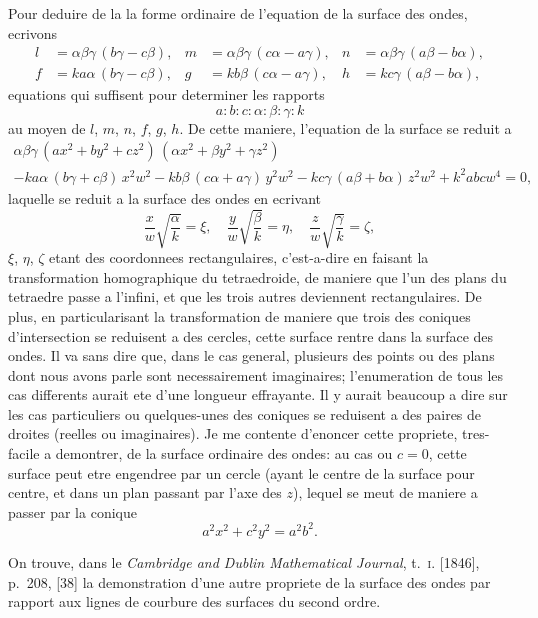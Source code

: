 \documentclass[11pt,a4paper]{book}
\begin{document}
Pour deduire de la la forme ordinaire de l'equation de la surface des ondes, ecrivons
\begin{align*}
l &= \alpha\beta\gamma\,(b\gamma - c\beta), & m &= \alpha\beta\gamma\,(c\alpha - a\gamma), & n &= \alpha\beta\gamma\,(a\beta - b\alpha), \\
f &= ka\alpha\,(b\gamma - c\beta), & g &= kb\beta\,(c\alpha - a\gamma), & h &= kc\gamma\,(a\beta - b\alpha),
\end{align*}
equations qui suffisent pour determiner les rapports
\[
a : b : c : \alpha : \beta : \gamma : k
\]
au moyen de $l$, $m$, $n$, $f$, $g$, $h$. De cette maniere, l'equation de la surface se reduit a
\begin{multline*}
\alpha\beta\gamma\,(ax^2 + by^2 + cz^2)\,(\alpha x^2 + \beta y^2 + \gamma z^2) \\
- ka\alpha\,(b\gamma + c\beta)\,x^2w^2 - kb\beta\,(c\alpha + a\gamma)\,y^2w^2 - kc\gamma\,(a\beta + b\alpha)\,z^2w^2 + k^2abcw^4 = 0,
\end{multline*}
laquelle se reduit a la surface des ondes en ecrivant
\[
\frac{x}{w}\sqrt{\frac{\alpha}{k}} = \xi, \quad \frac{y}{w}\sqrt{\frac{\beta}{k}} = \eta, \quad \frac{z}{w}\sqrt{\frac{\gamma}{k}} = \zeta,
\]
$\xi$, $\eta$, $\zeta$ etant des coordonnees rectangulaires, c'est-a-dire en faisant la transformation homographique du tetraedroide, de maniere que l'un des plans du tetraedre passe a l'infini, et que les trois autres deviennent rectangulaires. De plus, en particularisant la transformation de maniere que trois des coniques d'intersection se reduisent a des cercles, cette surface rentre dans la surface des ondes. Il va sans dire que, dans le cas general, plusieurs des points ou des plans dont nous avons parle sont necessairement imaginaires; l'enumeration de tous les cas differents aurait ete d'une longueur effrayante. Il y aurait beaucoup a dire sur les cas particuliers ou quelques-unes des coniques se reduisent a des paires de droites (reelles ou imaginaires). Je me contente d'enoncer cette propriete, tres-facile a demontrer, de la surface ordinaire des ondes: au cas ou $c = 0$, cette surface peut etre engendree par un cercle (ayant le centre de la surface pour centre, et dans un plan passant par l'axe des $z$), lequel se meut de maniere a passer par la conique
\[
a^2x^2 + c^2y^2 = a^2b^2.
\]

On trouve, dans le \textit{Cambridge and Dublin Mathematical Journal}, t.~\textsc{i}. [1846], p.~208, [38] la demonstration d'une autre propriete de la surface des ondes par rapport aux lignes de courbure des surfaces du second ordre.
\end{document}
